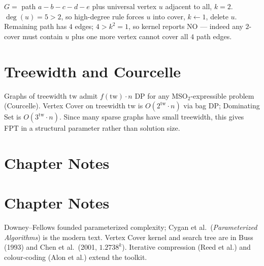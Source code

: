 $G=$ path $a{-}b{-}c{-}d{-}e$ plus universal vertex $u$ adjacent to all, $k=2$. $\deg(u)=5>2$, so high-degree rule forces $u$ into cover, $k\gets1$, delete $u$. Remaining path has $4$ edges; $4>k^2=1$, so kernel reports NO --- indeed any $2$-cover must contain $u$ plus one more vertex cannot cover all $4$ path edges.

\section{Treewidth and Courcelle}
\label{sec:treewidth}

Graphs of treewidth $\text{tw}$ admit $f(\text{tw})\cdot n$ DP for any MSO$_2$-expressible problem (Courcelle). Vertex Cover on treewidth $\text{tw}$ is $O(2^{\text{tw}}\cdot n)$ via bag DP; Dominating Set is $O(3^{\text{tw}}\cdot n)$. Since many sparse graphs have small treewidth, this gives FPT in a structural parameter rather than solution size.

\section{Chapter Notes}
\section{Chapter Notes}
Downey--Fellows founded parameterized complexity; Cygan et al.\ (\emph{Parameterized Algorithms}) is the modern text. Vertex Cover kernel and search tree are in Buss (1993) and Chen et al.\ (2001, $1.2738^k$). Iterative compression (Reed et al.) and colour-coding (Alon et al.) extend the toolkit.

